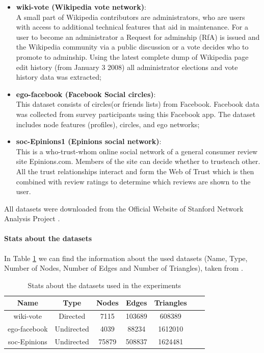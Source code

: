 \documentclass[a4paper,11pt, twoside]{article}
\begin{document}
         \begin{itemize}
                \item \textbf{wiki-vote (Wikipedia vote network)}: \\A small part of Wikipedia contributors are administrators, who are users with access to additional technical features that aid in maintenance. For a user to become an administrator a Request for adminship (RfA) is issued and the Wikipedia community via a public discussion or a vote decides who to promote to adminship. Using the latest complete dump of Wikipedia page edit history (from January 3 2008) all administrator elections and vote history data was extracted;
                \item \textbf{ego-facebook (Facebook Social circles)}: \\This dataset consists of \textquotesingle circles\textquotesingle (or \textquotesingle friends lists\textquotesingle) from Facebook. Facebook data was collected from survey participants using this Facebook app. The dataset includes node features (profiles), circles, and ego networks;
            \item \textbf{soc-Epinions1 (Epinions social network)}: \\ This is a who-trust-whom online social network of a general consumer review site Epinions.com. Members of the site can decide whether to \textquotesingle trust\textquotesingle each other. All the trust relationships interact and form the Web of Trust which is then combined with review ratings to determine which reviews are shown to the user.
        \end{itemize}
        All datasets were downloaded from the Official Website of Stanford Network Analysis Project \cite{datasets}.
    
        \paragraph{Stats about the datasets} In Table \ref{tab:stats} we can find the information about the used datasets (Name, Type, Number of Nodes, Number of Edges and Number of Triangles), taken from \cite{datasets}.
        \begin{table}[h!]
                \centering
            \small
            \begin{tabular}{ccccccc}
                \toprule
                Name & Type & Nodes & Edges & Triangles \\
                \midrule
                wiki-vote     & Directed      & 7115  & 103689    &  608389 \\
                ego-facebook  & Undirected    & 4039  & 88234     & 1612010 \\
                soc-Epinions  & Undirected    & 75879  & 508837   & 1624481 \\
                \bottomrule
            \end{tabular}
                \label{tab:stats}
                \caption{Stats about the datasets used in the experiments}
        \end{table}
    
\end{document}
